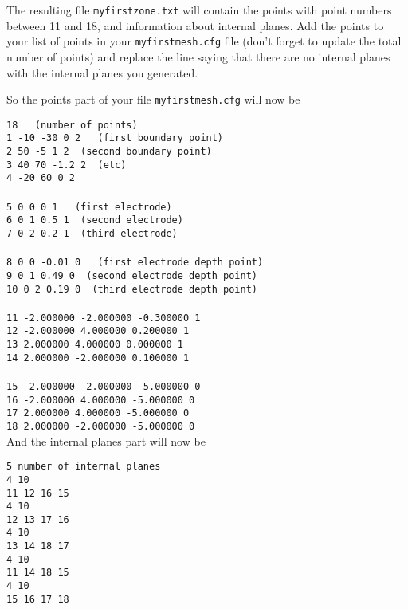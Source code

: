 \documentclass[11pt]{article}
\begin{document}
The resulting file \verb+myfirstzone.txt+ will contain the points
with point numbers between 11 and 18, and information about internal
planes. Add the points to your list of points in your
\verb+myfirstmesh.cfg+ file (don't forget to update the total number
of points) and replace the line saying that there are
no internal planes with the internal planes you generated.

So the points part of your file \verb+myfirstmesh.cfg+ will now be


\verb+18   (number of points)+\\
\verb+1 -10 -30 0 2   (first boundary point)+\\
\verb+2 50 -5 1 2  (second boundary point)+\\
\verb+3 40 70 -1.2 2  (etc)+\\
\verb+4 -20 60 0 2+\\
\verb++\\
\verb+5 0 0 0 1   (first electrode)+\\
\verb+6 0 1 0.5 1  (second electrode)+\\
\verb+7 0 2 0.2 1  (third electrode)+\\
\verb++\\
\verb+8 0 0 -0.01 0   (first electrode depth point)+\\
\verb+9 0 1 0.49 0  (second electrode depth point)+\\
\verb+10 0 2 0.19 0  (third electrode depth point)+\\
\verb++\\
\verb+11 -2.000000 -2.000000 -0.300000 1 +\\
\verb+12 -2.000000 4.000000 0.200000 1 +\\
\verb+13 2.000000 4.000000 0.000000 1 +\\
\verb+14 2.000000 -2.000000 0.100000 1 +\\
\verb++\\
\verb+15 -2.000000 -2.000000 -5.000000 0 +\\
\verb+16 -2.000000 4.000000 -5.000000 0 +\\
\verb+17 2.000000 4.000000 -5.000000 0 +\\
\verb+18 2.000000 -2.000000 -5.000000 0 +\\

And the internal planes part will now be

\verb+5 number of internal planes+\\
\verb+4 10+\\
\verb+11 12 16 15+\\
\verb+4 10+\\
\verb+12 13 17 16+\\
\verb+4 10+\\
\verb+13 14 18 17+\\
\verb+4 10+\\
\verb+11 14 18 15+\\
\verb+4 10+\\
\verb+15 16 17 18+\\ 
\verb++\\
\end{document}
